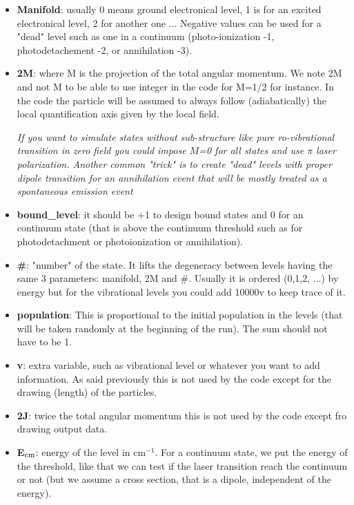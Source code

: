 \documentclass[amsmath,amssymb,nofootinbib]{revtex4-2}
\begin{document}
\begin{itemize}
\item 	 \textbf{Manifold}: usually 0 means ground electronical level, 1 is for an excited electronical level, 2 for another one ... Negative values can be used for a "dead" level such as one in a continuum (photo-ionization -1, photodetachement -2, or annihilation -3). 
	
	\item 	 \textbf{2M}: where  M is the projection of the total angular momentum. We note 2M and not M to be able to use integer in the code for M=1/2 for instance.
	In the code the particle will be assumed to always follow (adiabatically) the local quantification axis given by the local field.

{\it If you want to simulate states without sub-structure like pure ro-vibrational transition in zero field you could impose $M$=0 for all states and use $\pi$ laser polarization. Another common "trick" is to create "dead" levels with proper dipole transition for an annihilation event that will be mostly treated as a spontaneous emission event}	
	
\item 	 \textbf{bound\_level}:   it should be +1  to design  bound states and 0 for an continuum state (that is above the continuum threshold such as for photodetachment or photoionization or annihilation).

\item 	 \textbf{\#}: "number" of the state. It lifts the degeneracy between levels having the same 3 parameters: manifold, 2M and \#. Usually it is ordered (0,1,2, ...) by energy  but for the vibrational levels you could add 10000v to keep trace of it.

\item 	 \textbf{population}: This is proportional to the initial population in the levels (that will be taken randomly at the beginning of the run). The sum should not have to be 1.


\item \textbf{v}: extra variable, such as vibrational level or whatever you want to add information. As said previously this is not used by the code except for the drawing (length) of the particles. 

\item \textbf{2J}:  twice the total angular momentum this is not used by the code except fro drawing output data. 

 
\item \textbf{E$_{\rm cm}$}: energy of the level in cm$^{-1}$. For a continuum state, we put the energy of the threshold, like that we can test if the laser transition reach the continuum or not (but we assume a cross section, that is a dipole, independent of the energy).


\end{itemize}
\end{document}
